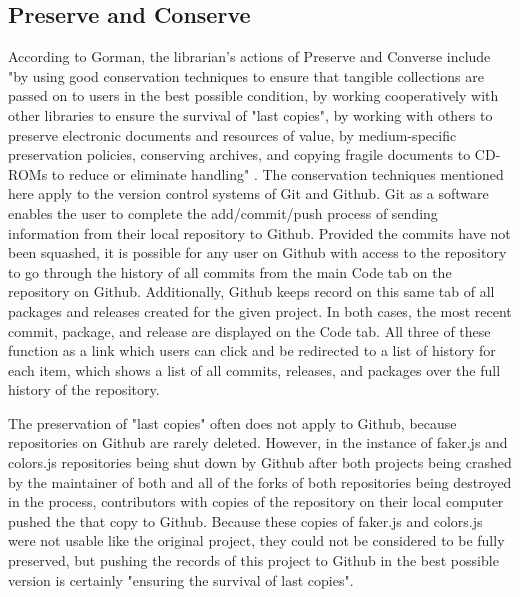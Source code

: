 \subsection{Preserve and Conserve}
According to Gorman, the librarian's actions of Preserve and Converse include "by using good conservation techniques to ensure that tangible collections are passed on to users in the best possible condition, by working cooperatively with other libraries to ensure the survival of "last copies", by working with others to preserve electronic documents and resources of value, by medium-specific preservation policies, conserving archives, and copying fragile documents to CD-ROMs to reduce or eliminate handling" \cite{gorman2000values}. The conservation techniques mentioned here apply to the version control systems of Git and Github. Git as a software enables the user to complete the add/commit/push process of sending information from their local repository to Github. Provided the commits have not been squashed, it is possible for any user on Github with access to the repository to go through the history of all commits from the main Code tab on the repository on Github. Additionally, Github keeps record on this same tab of all packages and releases created for the given project. In both cases, the most recent commit, package, and release are displayed on the Code tab. All three of these function as a link which users can click and be redirected to a list of history for each item, which shows a list of all commits, releases, and packages over the full history of the repository. 

The preservation of "last copies" often does not apply to Github, because repositories on Github are rarely deleted. However, in the instance of faker.js and colors.js repositories being shut down by Github after both projects being crashed by the maintainer of both and all of the forks of both repositories being destroyed in the process, contributors with copies of the repository on their local computer pushed the that copy to Github. Because these copies of faker.js and colors.js were not usable like the original project, they could not be considered to be fully preserved, but pushing the records of this project to Github in the best possible version is certainly "ensuring the survival of last copies"\cite{gorman2000values}.

